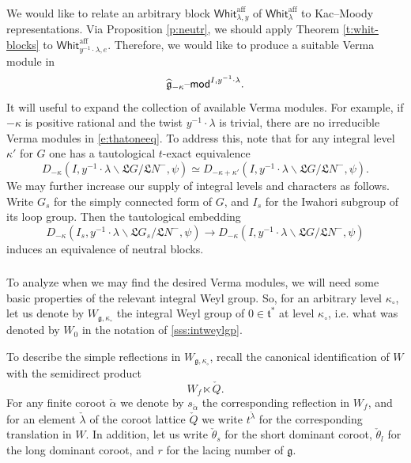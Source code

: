 \documentclass[11pt,reqno]{amsart}
\newcommand{\aff}{\operatorname{aff}}
\newcommand{\fL}{\mathfrak{L}}
\newcommand{\halpha}{\check{\alpha}}
\newcommand{\ft}{\mathfrak{t}}
\newcommand{\fg}{\mathfrak{g}}
\theoremstyle{remark}
\numberwithin{equation}{section}
\newcommand{\gmk}{\widehat{\fg}_{-\kappa}}
\renewcommand{\mod}{\text{\textendash}\mathsf{mod}}
\newcommand{\Whit}{\mathsf{Whit}}
\begin{document}
\subsubsection{}\label{sss:changeintlevel}We would like to relate an 
arbitrary block  
$\Whit_{\lambda, y}^{\aff}$ of $\Whit_{\lambda}^{\aff}$ to Kac--Moody 
representations. Via Proposition  
\ref{p:neutr}, we should apply Theorem \ref{t:whit-blocks} to $\Whit_{y^{-1} 
\cdot 
\lambda, e}^{\aff}$. Therefore, we would like to 
produce a suitable Verma module in 
%
\begin{equation} \label{e:thatoneeq} \gmk\mod^{I, y^{-1} \cdot \lambda}.
\end{equation}
%
It will useful to expand the collection of available Verma modules. For example,
if $-\kappa$ is positive rational and the twist $y^{-1} \cdot 
\lambda$ is trivial, there are no irreducible Verma modules in 
\eqref{e:thatoneeq}. To address this, 
note that for any integral level $\kappa'$ for $G$ one has a 
tautological $t$-exact equivalence
%
\[ D_{-\kappa}(I, y^{-1} \cdot \lambda \backslash \fL G / \fL N^-, \psi) \simeq 
D_{-\kappa + 
\kappa'}(I, y^{-1} \cdot \lambda \backslash \fL G / \fL N^-, \psi).
\]
%
We may further increase our supply of integral levels and characters as 
follows. Write $G_s$ for the simply 
connected form of $G$, and $I_s$ for the 
Iwahori subgroup of its loop group. Then the tautological embedding
%
\[ D_{-\kappa}( I_s, y^{-1} \cdot \lambda \backslash \fL G_s / \fL N^-, \psi) 
\rightarrow 
D_{-\kappa}(I, y^{-1} \cdot \lambda \backslash \fL G / \fL N^-, \psi)
\]
%
induces an equivalence of neutral blocks. 


\subsubsection{}To analyze when we may find the desired Verma modules, we will 
need some basic properties of the relevant integral Weyl group. So, for an 
arbitrary level $\kappa_{\circ}$, let us denote by $W_{\fg, \kappa_{\circ}}$ 
the integral Weyl group of $0 \in \ft^*$ at level $\kappa_\circ$, i.e. what was 
denoted by
$W_0$ in the notation of \ref{sss:intweylgp}. 


To describe the simple reflections in $W_{\fg, \kappa_{\circ}}$, recall the 
canonical identification of $W$ with the semidirect product
%
\[ W_f \ltimes \check{Q}.
\]
%
For any finite coroot $\halpha$ we denote by $s_{\halpha}$ the corresponding 
reflection in $W_f$, and for an element $\check{\lambda}$ of the coroot lattice 
$\check{Q}$ we write $t^{\check{\lambda}}$ for the corresponding translation in 
$W$. In addition, let us write $\check{\theta}_s$ for the short dominant 
coroot, $\check{\theta}_l$ for the long dominant coroot, and $r$ for the lacing 
number of $\fg$.  
\end{document}
